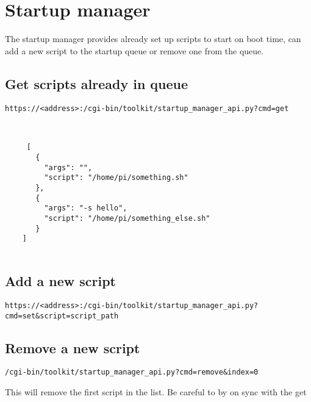 \documentclass[12pt]{article}
\begin{document}
\section{Startup manager}
    
    The startup manager provides already set up scripts to start on boot time, can add a new script to the startup queue or remove one from the queue.
    
    
    \subsection{Get scripts already in queue}
    
    \texttt{https://<address>:/cgi-bin/toolkit/startup\_manager\_api.py?cmd=get}
    
    \begin{verbatim}
   
   
     [
       {
         "args": "",
         "script": "/home/pi/something.sh"
       },
       {
         "args": "-s hello",
         "script": "/home/pi/something_else.sh"
       }
    ]
    
    \end{verbatim} 
    
    
    \subsection{Add a new script}
    
    \texttt{https://<address>:/cgi-bin/toolkit/startup\_manager\_api.py?cmd=set\&script=script\_path}
    
   
   \subsection{Remove a new script}
   
   \texttt{/cgi-bin/toolkit/startup\_manager\_api.py?cmd=remove\&index=0}
   
   This will remove the first script in the list. Be careful to by on sync with the get
   
    
   
\end{document}
